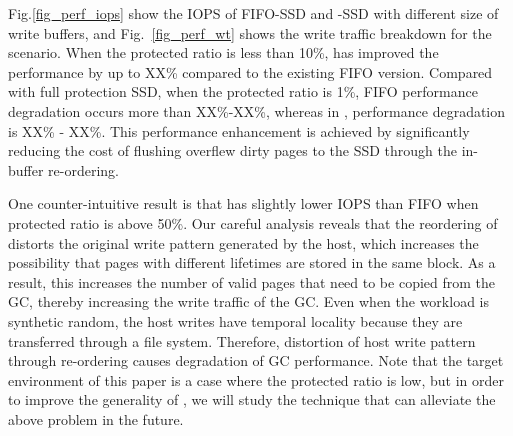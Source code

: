 Fig.\ref{fig_perf_iops} show the IOPS of FIFO-SSD and \ours{}-SSD with different size of write buffers, and Fig.~\ref{fig_perf_wt} shows the write traffic breakdown for the scenario.
When the protected ratio is less than 10\%, \ours{} has improved the performance by up to XX\% compared to the existing FIFO version.
Compared with full protection SSD, when the protected ratio is 1\%, FIFO performance degradation occurs more than XX\%-XX\%, whereas in \ours{}, performance degradation is XX\% - XX\%. This performance enhancement is achieved by significantly reducing the cost of flushing overflew dirty pages to the SSD through the in-buffer re-ordering.
\iffalse
protected ratio 가 10\% 이하일 때 DAWID 이 기존 FIFO 방식 버전보다 최대 XX\%
성능을 향상시켰다.  Full protected 경우와 비교하면 protected ratio 가 1\%로
줄어들 때 FIFO는 성능저하가 XX\%-XX\% 이상 발생하는 반면, DAWID은 성능저하가
XX\% - XX\% 에 머물렀다.  이러한 성능향상 효과는 mapping table 의 영속성을 위해
dirty page 를 SSD에 flush 하는 오버헤드를 in-buffer re-ordering 을 통해 상당히
많이 줄였기 때문이다. 
Fig.~\ref{fio_perf_wt}에서 보는바와 같이 DAWID은 protected ratio 가 작을 때에도
mapping table flush 오버헤드를 거의 없애 FIFO 대비 쓰기량을 최대 XX\%까지 절감하였다. 
\fi

\iffalse
한가지 예상치 못한 결과는 protected ratio 가 50\% 이상일 때 DAWID이 FIFO보다
IOPS가 살짝 낮다는 것이다. In-depth analysis 를 수행한 결과 reordering 이 host
에서 발생시키는 본연의 write pattern 을 distort 하게 되는데 이로 인해 lifetime
이 다른 page 들이 동일 블록에 저장되는 가능성을 높이기 때문이다. 결과적으로
이는 GC에서 copy 해야 하는 valid page 의 숫자를 증가시켜 GC의 write traffic 을
늘린다.  워크로드가 synthetic random 인 상황에서도 파일시스템을 거쳐서 들어오기
때문에 temporal locality 를 가짐. 이에 re-ordering 을 통한 host write pattern
의 왜곡이 GC의 성능 저하를 일으키게 됨. 본 논문에서 targeting 하는 상황은
protected ratio 가 낮은 경우이지만 기법의 적용성(?)을 향상시키기 위해 상기 문제를 
완화시킬 수 있는 기법에 대해 향후 연구해보고자 합. 
\fi

One counter-intuitive result is that \ours{} has slightly lower IOPS than FIFO when protected ratio is above 50\%. Our careful analysis reveals that the reordering of \ours{} distorts the original write pattern generated by the host, which increases the possibility that pages with different lifetimes are stored in the same block. As a result, this increases the number of valid pages that need to be copied from the GC, thereby increasing the write traffic of the GC. Even when the workload is synthetic random, the host writes have temporal locality because they are transferred through a file system. Therefore, distortion of host write pattern through re-ordering causes degradation of GC performance. Note that the target environment of this paper is a case where the protected ratio is low, but in order to improve the generality of \ours{}, we will study the technique that can alleviate the above problem in the future.


